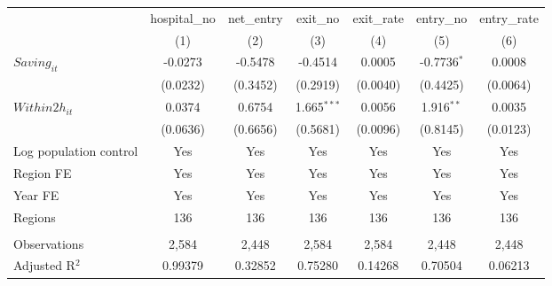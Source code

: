 \begingroup
\centering
\begin{tabular}{lcccccc}
   \toprule
                          & hospital\_no  & net\_entry  & exit\_no      & exit\_rate  & entry\_no     & entry\_rate \\    
                          & (1)           & (2)         & (3)           & (4)         & (5)           & (6)\\  
   \midrule 
   $Saving_{it}$          & -0.0273       & -0.5478     & -0.4514       & 0.0005      & -0.7736$^{*}$ & 0.0008\\   
                          & (0.0232)      & (0.3452)    & (0.2919)      & (0.0040)    & (0.4425)      & (0.0064)\\   
   $Within2h_{it}$        & 0.0374        & 0.6754      & 1.665$^{***}$ & 0.0056      & 1.916$^{**}$  & 0.0035\\   
                          & (0.0636)      & (0.6656)    & (0.5681)      & (0.0096)    & (0.8145)      & (0.0123)\\   
   Log population control & Yes           & Yes         & Yes           & Yes         & Yes           & Yes\\  
   Region FE              & Yes           & Yes         & Yes           & Yes         & Yes           & Yes\\  
   Year FE                & Yes           & Yes         & Yes           & Yes         & Yes           & Yes\\  
   Regions                & 136           & 136         & 136           & 136         & 136           & 136\\  
    \\
   Observations           & 2,584         & 2,448       & 2,584         & 2,584       & 2,448         & 2,448\\  
   Adjusted R$^2$         & 0.99379       & 0.32852     & 0.75280       & 0.14268     & 0.70504       & 0.06213\\  
   \bottomrule
\end{tabular}
\par\endgroup
